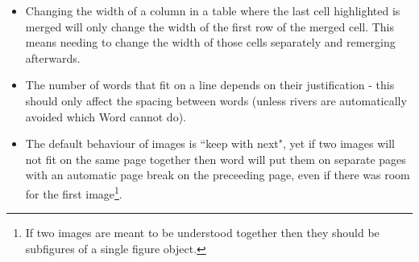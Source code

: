 \begin{itemize}
	\item Changing the width of a column in a table where the last cell highlighted is merged will only change the width of the first row of the merged cell. This means needing to change the width of those cells separately and remerging afterwards.
	\item The number of words that fit on a line depends on their justification - this should only affect the spacing between words (unless rivers are automatically avoided which Word cannot do).
	\item The default behaviour of images is ``keep with next", yet if two images will not fit on the same page together then word will put them on separate pages with an automatic page break on the preceeding page, even if there was room for the first image\footnote{If two images are meant to be understood together then they should be subfigures of a single figure object.}.
\end{itemize}